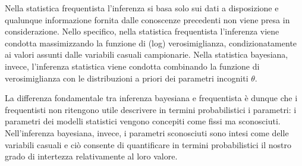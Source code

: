 \documentclass[
]{memoir}
\theoremstyle{definition}
\theoremstyle{definition}
\theoremstyle{definition}
\theoremstyle{definition}
\theoremstyle{remark}
\begin{document}
Nella statistica frequentista l'inferenza si basa solo sui dati a disposizione e qualunque informazione fornita dalle conoscenze precedenti non viene presa in considerazione. Nello specifico, nella statistica frequentista l'inferenza viene condotta massimizzando la funzione di (log) verosimiglianza, condizionatamente ai valori assunti dalle variabili casuali campionarie. Nella statistica bayesiana, invece, l'inferenza statistica viene condotta combinando la funzione di verosimiglianza con le distribuzioni a priori dei parametri incogniti \(\theta\).

La differenza fondamentale tra inferenza bayesiana e frequentista è dunque che i frequentisti non ritengono utile descrivere in termini probabilistici i parametri: i parametri dei modelli statistici vengono concepiti come fissi ma sconosciuti. Nell'inferenza bayesiana, invece, i parametri sconosciuti sono intesi come delle variabili casuali e ciò consente di quantificare in termini probabilistici il nostro grado di intertezza relativamente al loro valore.

  
\end{document}
